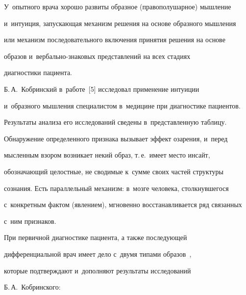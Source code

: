   

  У~опытного врача хорошо развиты образное (правополушарное) мышление 

и~интуиция, запускающая механизм решения на основе образного мышления 

или механизм последовательного включения принятия решения на основе 

образов и~вер\-баль\-но-зна\-ко\-вых представлений на всех стадиях 

диагностики пациента.

  

  Б.\,А.~Кобринский в~работе~[5] исследовал применение интуиции 

и~образного мышления специалистом в~медицине при диагностике пациентов. 

Результаты анализа его исследований сведены в~представленную таблицу. 

  

 

  

  Обнаружение определенного признака вызывает эффект озарения, и~перед 

мысленным взором возникает некий образ, т.\,е.\ имеет место инсайт, 

обозначающий целостные, не сводимые к~сумме своих частей структуры 

сознания. Есть параллельный механизм: в~мозге человека, столкнувшегося 

с~конкретным фактом (явлением), мгновенно восстанавливается ряд связанных 

с~ним признаков. 

  

  При первичной диагностике пациента, а также последующей 

дифференциальной врач имеет дело с~двумя типами образов~\cite{8-rum}, 

которые подтверждают и~дополняют результаты исследований 

Б.\,А.~Кобринского: 

